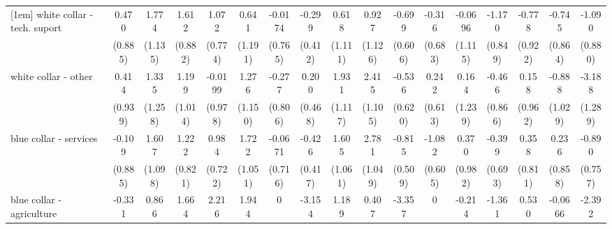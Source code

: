 {\begin{tabular}{l*{16}{c}}
[1em]
white collar - tech. suport&       0.470         &       1.774         &       1.612         &       1.072         &       0.641         &     -0.0174         &      -0.299         &       0.618         &       0.927         &      -0.699         &      -0.316         &     -0.0696         &      -1.170         &      -0.778         &      -0.745         &      -1.090         \\
                    &     (0.885)         &     (1.135)         &     (0.882)         &     (0.774)         &     (1.191)         &     (0.765)         &     (0.412)         &     (1.111)         &     (1.126)         &     (0.606)         &     (0.683)         &     (1.115)         &     (0.849)         &     (0.922)         &     (0.864)         &     (0.880)         \\
[1em]
white collar - other&       0.414         &       1.335         &       1.199         &     -0.0199         &       1.276         &      -0.277         &       0.200         &       1.931         &       2.415\sym{*}  &      -0.536         &       0.242         &       0.164         &      -0.466         &       0.158         &      -0.888         &      -3.188\sym{*}  \\
                    &     (0.939)         &     (1.258)         &     (1.014)         &     (0.978)         &     (1.150)         &     (0.806)         &     (0.468)         &     (1.117)         &     (1.105)         &     (0.620)         &     (0.613)         &     (1.239)         &     (0.866)         &     (0.962)         &     (1.029)         &     (1.289)         \\
[1em]
blue collar - services&      -0.109         &       1.607         &       1.222         &       0.984         &       1.722         &     -0.0671         &      -0.426         &       1.605         &       2.781\sym{**} &      -0.815         &      -1.082         &       0.370         &      -0.399         &       0.358         &       0.236         &      -0.890         \\
                    &     (0.885)         &     (1.098)         &     (0.821)         &     (0.722)         &     (1.051)         &     (0.716)         &     (0.417)         &     (1.061)         &     (1.049)         &     (0.509)         &     (0.605)         &     (0.982)         &     (0.693)         &     (0.811)         &     (0.858)         &     (0.757)         \\
[1em]
blue collar - agriculture&      -0.331         &       0.866         &       1.664         &       2.216\sym{*}  &       1.944         &           0         &      -3.154\sym{**} &       1.189         &       0.407         &      -3.357\sym{**} &           0         &      -0.214         &      -1.361         &       0.530         &     -0.0666         &      -2.392\sym{*}  \\

\end{tabular}}
